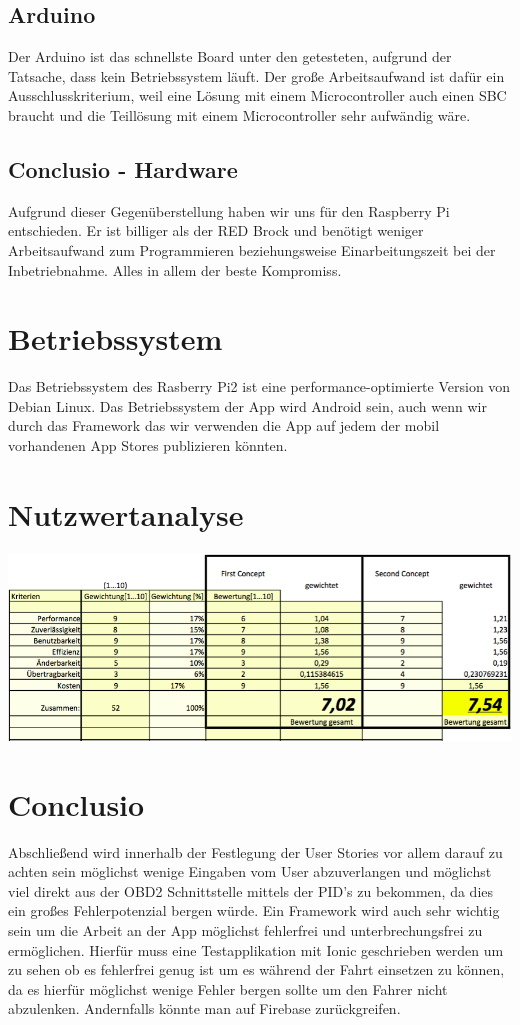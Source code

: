 \subsection{Arduino}
Der Arduino ist das schnellste Board unter den getesteten, aufgrund der Tatsache, dass kein Betriebssystem läuft. Der große Arbeitsaufwand ist dafür ein Ausschlusskriterium, weil eine Lösung mit einem Microcontroller auch einen SBC braucht und die Teillösung mit einem Microcontroller sehr aufwändig wäre.

\subsection{Conclusio - Hardware}
Aufgrund dieser Gegenüberstellung haben wir uns für den Raspberry Pi entschieden. Er ist billiger als der RED Brock und benötigt weniger Arbeitsaufwand zum Programmieren beziehungsweise Einarbeitungszeit bei der Inbetriebnahme. Alles in allem der beste Kompromiss.

\newpage
\section {Betriebssystem}
Das Betriebssystem des Rasberry Pi2 ist eine performance-optimierte Version von Debian Linux.
Das Betriebssystem der App wird Android sein, auch wenn wir durch das Framework das wir verwenden die App auf jedem der mobil vorhandenen App Stores publizieren könnten.

\section {Nutzwertanalyse}
\includegraphics[scale=0.5]{images/Nutzwert.png}

\section {Conclusio}
Abschließend wird innerhalb der Festlegung der User Stories vor allem darauf zu achten sein möglichst wenige Eingaben vom User abzuverlangen und möglichst viel direkt aus der OBD2 Schnittstelle mittels der PID's zu bekommen, da dies ein großes Fehlerpotenzial bergen würde. 
Ein Framework wird auch sehr wichtig sein um die Arbeit an der App möglichst fehlerfrei und unterbrechungsfrei zu ermöglichen. Hierfür muss eine Testapplikation mit Ionic geschrieben werden um zu sehen ob es fehlerfrei genug ist um es während der Fahrt einsetzen zu können, da es hierfür möglichst wenige Fehler bergen sollte um den Fahrer nicht abzulenken. Andernfalls könnte man auf Firebase zurückgreifen.
